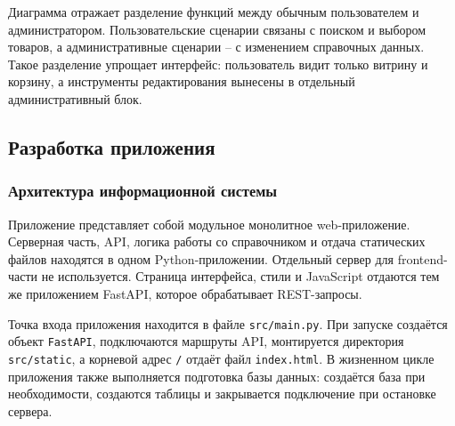 \documentclass[a4paper,14pt]{extarticle}
\begin{document}
Диаграмма отражает разделение функций между обычным пользователем и администратором. Пользовательские сценарии связаны с поиском и выбором товаров, а административные сценарии -- с изменением справочных данных. Такое разделение упрощает интерфейс: пользователь видит только витрину и корзину, а инструменты редактирования вынесены в отдельный административный блок.

\subsection{Разработка приложения}

\subsubsection{Архитектура информационной системы}

Приложение представляет собой модульное монолитное web-приложение. Серверная часть, API, логика работы со справочником и отдача статических файлов находятся в одном Python-приложении. Отдельный сервер для frontend-части не используется. Страница интерфейса, стили и JavaScript отдаются тем же приложением FastAPI, которое обрабатывает REST-запросы.

Точка входа приложения находится в файле \texttt{src/main.py}. При запуске создаётся объект \texttt{FastAPI}, подключаются маршруты API, монтируется директория \texttt{src/static}, а корневой адрес \texttt{/} отдаёт файл \texttt{index.html}. В жизненном цикле приложения также выполняется подготовка базы данных: создаётся база при необходимости, создаются таблицы и закрывается подключение при остановке сервера.
\end{document}

